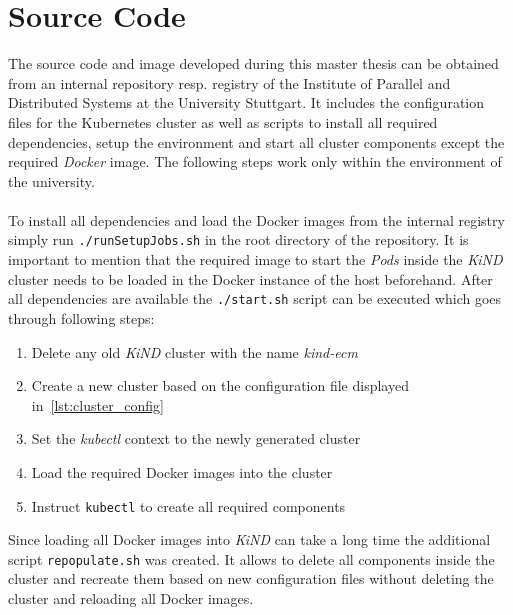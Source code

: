 \section{Source Code}
The source code and image developed during this master thesis can be obtained from an internal repository resp. registry of the Institute of Parallel and Distributed Systems at the University Stuttgart.
It includes the configuration files for the Kubernetes cluster as well as scripts to install all required dependencies, setup the environment and start all cluster components except the required \textit{Docker} image.
The following steps work only within the environment of the university.
\\
\\
To install all dependencies and load the Docker images from the internal registry simply run \texttt{./runSetupJobs.sh} in the root directory of the repository.
It is important to mention that the required image to start the \textit{Pods} inside the \textit{KiND} cluster needs to be loaded in the Docker instance of the host beforehand.
After all dependencies are available the \texttt{./start.sh} script can be executed which goes through following steps:
\begin{enumerate}
    \item Delete any old \textit{KiND} cluster with the name \textit{kind-ecm}
    \item Create a new cluster based on the configuration file displayed in~\cref{lst:cluster_config}
    \item Set the \textit{kubectl} context to the newly generated cluster
    \item Load the required Docker images into the cluster
    \item Instruct \texttt{kubectl} to create all required components
\end{enumerate}
Since loading all Docker images into \textit{KiND} can take a long time the additional script \texttt{repopulate.sh} was created.
It allows to delete all components inside the cluster and recreate them based on new configuration files without deleting the cluster and reloading all Docker images.